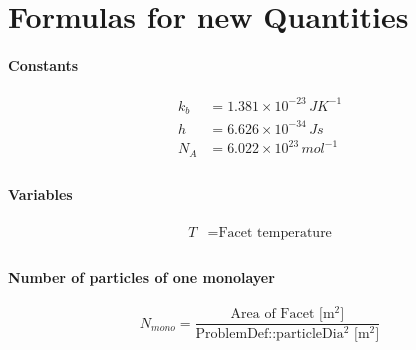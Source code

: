 
\chapter{Formulas for new Quantities}\label{chapter:Formulas}

\subsubsection*{Constants}
\begin{equation}
	\begin{split}
	k_b&=1.381\times10^{-23}\,JK^{-1}\\
	h&=6.626\times10^{-34}\,Js\\
	N_A&=6.022\times10^{23}\,mol^{-1}\\
	\end{split}
\end{equation}


\subsubsection*{Variables}
\begin{equation}
	\begin{split}
	T&=\text{Facet temperature}\\
	\end{split}
\end{equation}

\subsubsection*{Number of particles of one monolayer}
\begin{equation}
	\label{eq:nmono}
	N_{mono}=\frac{\text{Area of Facet [m$^2$]}}{\text{ProblemDef::particleDia$^2$ [m$^2$]}}
\end{equation}


